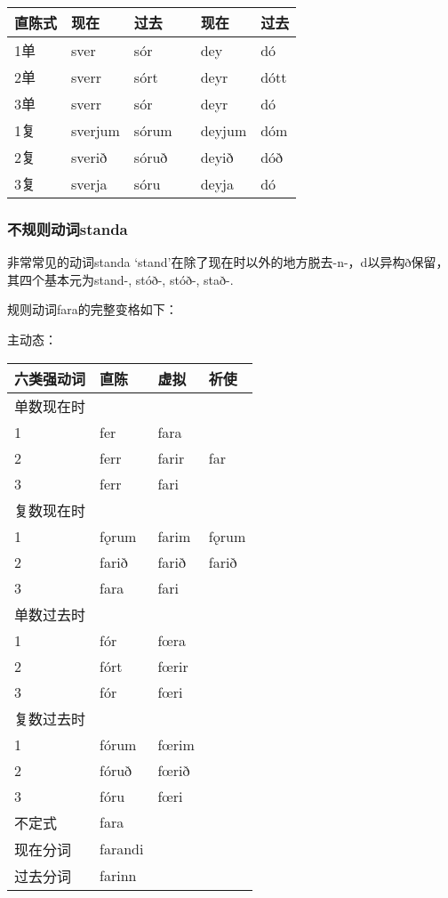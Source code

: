 \begin{longtable}{llllll}
    \toprule
    直陈式 & 现在      & 过去    &  & 现在     & 过去   \\
    \midrule
    \endhead
    \bottomrule
    \endfoot
    1单  & sver    & sór   &  & dey    & dó   \\
    2单  & sverr   & sórt  &  & deyr   & dótt \\
    3单  & sverr   & sór   &  & deyr   & dó   \\
    1复  & sverjum & sórum &  & deyjum & dóm  \\
    2复  & sverið  & sóruð &  & deyið  & dóð  \\
    3复  & sverja  & sóru  &  & deyja  & dó   \\
\end{longtable}

\subsubsection{不规则动词standa}

非常常见的动词standa `stand‌'在除了现在时以外的地方脱去-n-，d以异构ð保留，其四个基本元为stand-, stóð-, stóð-, stað-.


规则动词fara的完整变格如下：

主动态：


\begin{longtable}{llll}
    \toprule
    六类强动词 & 直陈      & 虚拟    & 祈使    \\
    \midrule
    \endhead
    \bottomrule
    \endfoot
    单数现在时 &         &       &       \\
    1     & fer     & fara  &       \\
    2     & ferr    & farir & far   \\
    3     & ferr    & fari  &       \\
    复数现在时 &         &       &       \\
    1     & fǫrum   & farim & fǫrum \\
    2     & farið   & farið & farið \\
    3     & fara    & fari  &       \\
    单数过去时 &         &       &       \\
    1     & fór     & fœra  &       \\
    2     & fórt    & fœrir &       \\
    3     & fór     & fœri  &       \\
    复数过去时 &         &       &       \\
    1     & fórum   & fœrim &       \\
    2     & fóruð   & fœrið &       \\
    3     & fóru    & fœri  &       \\
    不定式   & fara    &       &       \\
    现在分词  & farandi &       &       \\
    过去分词  & farinn  &       &       \\
\end{longtable}

